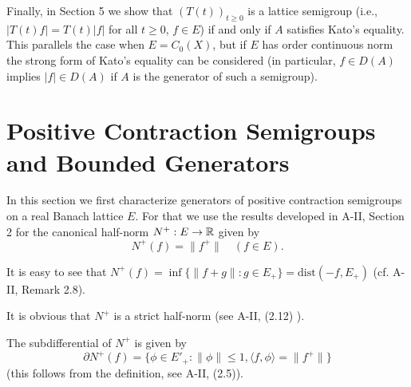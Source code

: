 
Finally, in Section 5 we show that $(T(t))_{t \geq 0}$ is a lattice semigroup (i.e., $|T(t) f| = T(t) |f|$ for all $t \geq 0$, $f \in E$) if and only if $A$ satisfies Kato's equality.
This parallels the case when $E = C_{0}(X)$, but if $E$ has order continuous norm the strong form of Kato's equality can be considered (in particular, $f \in D(A)$ implies $|f| \in D(A)$ if $A$ is the generator of such a semigroup).

\section{Positive Contraction Semigroups and Bounded Generators}
\label{sec:c2-1}

In this section we first characterize generators of positive contraction semigroups on a real Banach lattice $E$.
For that we use the results developed in A-II, Section 2 for the canonical half-norm $N^{+} : E \to \mathbb{R}$ given by
\begin{equation}\label{eq:c2-1.1}
N^{+}(f) = \|f^{+}\| \quad (f \in E).
\end{equation}

\begin{remark*}\label{rem:c2-1.1}
It is easy to see that $N^{+}(f) = \inf \{\|f+g\| : g \in E_{+}\} = \text{dist}(-f,E_{+})$ (cf. A-II, Remark 2.8). 
\end{remark*}

It is obvious that $N^{+}$ is a strict half-norm (see A-II, (2.12) ). 

The subdifferential of $N^{+}$ is given by
\begin{equation}\label{eq:c2-1.2}
\partial N^{+}(f) = \{\phi \in E'_{+} : \|\phi\| \leq 1, \langle f,\phi \rangle = \|f^{+}\|\}
\end{equation}
(this follows from the definition, see A-II, (2.5)). 

